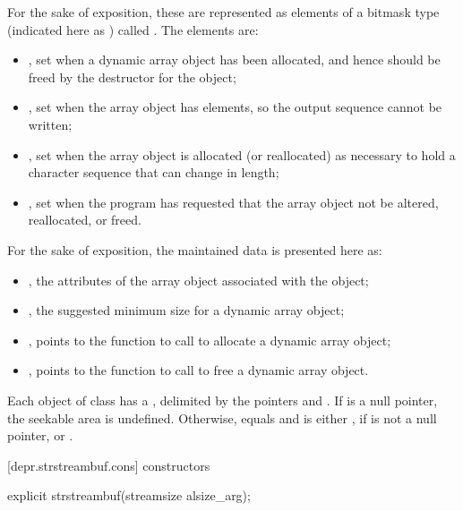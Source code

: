 \pnum
\begin{note}
For the sake of exposition, these are represented as elements of a bitmask type
(indicated here as ) called .
The elements are:
\begin{itemize}
\item
{}, set when a dynamic array object has been
allocated, and hence should be freed by the destructor for the
 object;
\item
{}, set when the array object has
 elements, so the output sequence cannot be written;
\item
{}, set when the array object is allocated
(or reallocated)
as necessary to hold a character sequence that can change in length;
\item
{}, set when the program has requested that the
array object not be altered, reallocated, or freed.
\end{itemize}
\end{note}

\pnum
\begin{note}
For the sake of exposition, the maintained data is presented here as:
\begin{itemize}
\item
{}, the attributes of the array object
associated with the  object;
\item
{}, the suggested minimum size for a
dynamic array object;
\item
{}, points to the function
to call to allocate a dynamic array object;
\item
{}, points to the function to
call to free a dynamic array object.
\end{itemize}
\end{note}

\pnum
Each object of class
has a
,
delimited by the pointers  and .
If  is a null pointer, the seekable area is undefined.
Otherwise,  equals  and
 is either ,
if  is not a null pointer, or .

[depr.strstreambuf.cons]{ constructors}

%
\begin{itemdecl}
explicit strstreambuf(streamsize alsize_arg);
\end{itemdecl}

